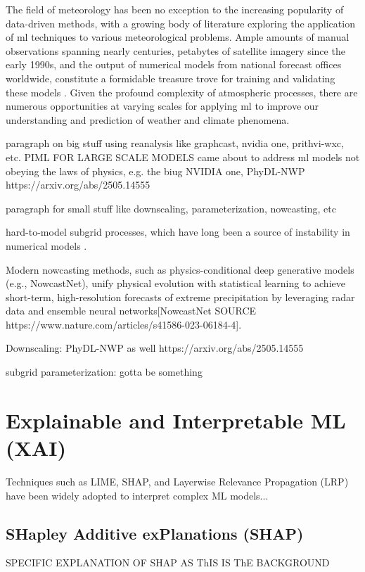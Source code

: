 The field of meteorology has been no exception to the increasing popularity of data-driven methods, with a growing body of literature exploring the application of \acrshort{ml} techniques to various meteorological problems. Ample amounts of manual observations spanning nearly centuries, petabytes of satellite imagery since the early 1990s, and the output of numerical models from national forecast offices worldwide, constitute a formidable treasure trove for training and validating these models \citep{Waqas2024}. Given the profound complexity of atmospheric processes, there are numerous opportunities at varying scales for applying \acrshort{ml} to improve our understanding and prediction of weather and climate phenomena.

paragraph on big stuff using reanalysis like graphcast, nvidia one, prithvi-wxc, etc.
PIML FOR LARGE SCALE MODELS came about to address ml models not obeying the laws of physics, e.g. the biug NVIDIA one, PhyDL-NWP https://arxiv.org/abs/2505.14555


paragraph for small stuff like downscaling, parameterization, nowcasting, etc

hard-to-model subgrid processes, which have long been a source of instability in numerical models .


Modern nowcasting methods, such as physics-conditional deep generative models (e.g., NowcastNet), unify physical evolution with statistical learning to achieve short-term, high-resolution forecasts of extreme precipitation by leveraging radar data and ensemble neural networks[NowcastNet SOURCE https://www.nature.com/articles/s41586-023-06184-4]. 

Downscaling: PhyDL-NWP as well https://arxiv.org/abs/2505.14555

subgrid parameterization: gotta be something

\section{Explainable and Interpretable ML (XAI)}

Techniques such as LIME, SHAP, and Layerwise Relevance Propagation (LRP) have been widely adopted to interpret complex ML models...

\subsection{SHapley Additive exPlanations (SHAP)}
SPECIFIC EXPLANATION OF SHAP AS ThIS IS ThE BACKGROUND 

